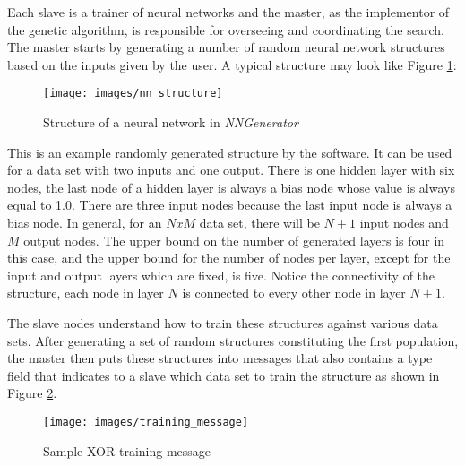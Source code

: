 Each slave is a trainer of neural networks and the master, as the implementor of the genetic algorithm, is responsible for overseeing and coordinating the search.
The master starts by generating a number of random neural network structures based on the inputs given by the user.
A typical structure may look like Figure \ref{nn_structure}:

\begin{figure}[h!]
  \centering
  \texttt{[image: images/nn\_structure]}
  \caption{Structure of a neural network in {\it NNGenerator}}
  \label{nn_structure}
\end{figure}

This is an example randomly generated structure by the software.
It can be used for a data set with two inputs and one output.
There is one hidden layer with six nodes, the last node of a hidden layer is always a bias node whose value is always equal to 1.0.
There are three input nodes because the last input node is always a bias node.
In general, for an \begin{math}N x M\end{math} data set, there will be \begin{math}N + 1\end{math} input nodes and \begin{math}M\end{math} output nodes.
The upper bound on the number of generated layers is four in this case, and the upper bound for the number of nodes per layer, except for the input and output layers which are fixed, is five.
Notice the connectivity of the structure, each node in layer \begin{math}N\end{math} is connected to every other node in layer \begin{math}N+1\end{math}.  

The slave nodes understand how to train these structures against various data sets.
After generating a set of random structures constituting the first population, the master then puts these structures into messages that also contains a type field that indicates to a slave which data set to train the structure as shown in Figure \ref{training_message}.

\begin{figure}[h!]
  \centering
  \texttt{[image: images/training\_message]}
  \caption{Sample XOR training message}
  \label{training_message}
\end{figure}

